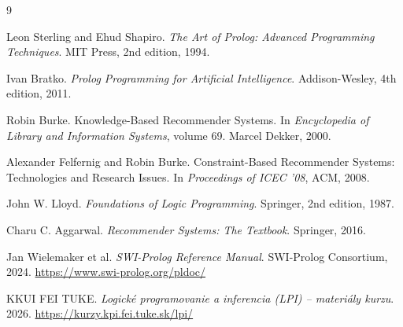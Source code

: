 \documentclass[11pt,a4paper]{article}
\begin{document}
\begin{thebibliography}{9}

Leon Sterling and Ehud Shapiro.
\textit{The Art of Prolog: Advanced Programming Techniques}.
MIT Press, 2nd edition, 1994.

Ivan Bratko.
\textit{Prolog Programming for Artificial Intelligence}.
Addison-Wesley, 4th edition, 2011.

Robin Burke.
Knowledge-Based Recommender Systems.
In \textit{Encyclopedia of Library and Information Systems}, volume 69.
Marcel Dekker, 2000.

Alexander Felfernig and Robin Burke.
Constraint-Based Recommender Systems: Technologies and Research Issues.
In \textit{Proceedings of ICEC '08}, ACM, 2008.

John W. Lloyd.
\textit{Foundations of Logic Programming}.
Springer, 2nd edition, 1987.

Charu C. Aggarwal.
\textit{Recommender Systems: The Textbook}.
Springer, 2016.

Jan Wielemaker et al.
\textit{SWI-Prolog Reference Manual}.
SWI-Prolog Consortium, 2024.
\url{https://www.swi-prolog.org/pldoc/}

KKUI FEI TUKE.
\textit{Logické programovanie a inferencia (LPI) -- materiály kurzu}.
2026.
\url{https://kurzy.kpi.fei.tuke.sk/lpi/}

\end{thebibliography}
\end{document}
